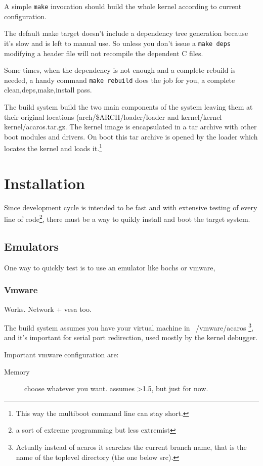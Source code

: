 A simple \texttt{make} invocation should build the whole kernel according to current configuration.

The default \textsf{make} target doesn't include a dependency tree generation because it's slow
and is left to manual use. So unless you don't issue a \texttt{make deps} modifying a header
file will not recompile the dependent C files. 

Some times, when the dependency is not enough
and a complete rebuild is needed, a handy command \texttt{make rebuild} does the job for you,
a complete clean,deps,make,install pass.

The build system build the two main components of the system
leaving them at their original locations (\textsf{arch/\${ARCH}/loader/loader} and
\textsf{kernel/kernel} \textsf{kernel/acaros.tar.gz}. The kernel image is encapsulated
in a tar archive with other boot modules and drivers. On boot this tar archive is opened
by the loader which locates the kernel and loads it.\footnote{This way the multiboot
command line can stay short.}

\section{Installation}

Since \acaros development cycle is intended to be fast and with extensive testing
of every line of code\footnote{a sort of extreme programming but less extremist}, 
there must be a way to quikly install and boot the target system.

\subsection{Emulators}
One way to quickly test \acaros is to use an emulator like \textsf{bochs} or \textsf{vmware},
\subsubsection{Vmware}
Works. Network + vesa too.

The build system assumes you have your virtual machine in \textsf{~/vmware/acaros}
\footnote{Actually instead of \textsf{acaros} it searches the current branch name,
that is the name of the toplevel directory (the one below \textsf{src}).},
and it's important for serial port redirection, used mostly by the kernel debugger.

Important vmware configuration are:
\begin{description}
\item[Memory] choose whatever you want. \acaros assumes >1.5, but just for now.
\end{description}

